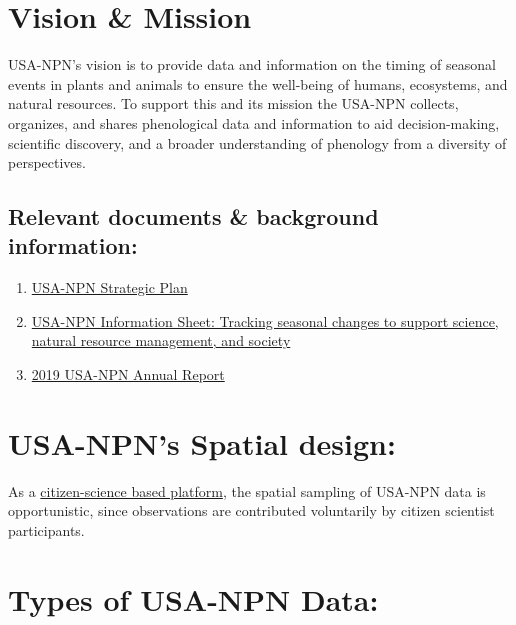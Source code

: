 \documentclass[]{book}
\begin{document}
\hypertarget{vision-mission}{%
\section{Vision \& Mission}\label{vision-mission}}

USA-NPN's vision is to provide data and information on the timing of seasonal events in plants and animals to ensure the well-being of humans, ecosystems, and natural resources. To support this and its mission the USA-NPN collects, organizes, and shares phenological data and information to aid decision-making, scientific discovery, and a broader understanding of phenology from a diversity of perspectives.

\hypertarget{relevant-documents-background-information}{%
\subsection{Relevant documents \& background information:}\label{relevant-documents-background-information}}

\begin{enumerate}
\def\labelenumi{\arabic{enumi}.}
\item
  \href{https://usanpn.org/files/npn/reports/USA-NPN_StrategicPlan_2019-2024.pdf}{USA-NPN Strategic Plan}
\item
  \href{https://usanpn.org/files/npn/reports/USA-NPN_InfoSheet_2020.pdf}{USA-NPN Information Sheet: Tracking seasonal changes to support science, natural resource management, and society}
\item
  \href{https://www.usanpn.org/files/npn/reports/USA-NPN_AnnualReport2019.pdf}{2019 USA-NPN Annual Report}
\end{enumerate}

\hypertarget{usa-npns-spatial-design}{%
\section{USA-NPN's Spatial design:}\label{usa-npns-spatial-design}}

As a \href{https://www.youtube.com/watch?v=WR34LGvuFac}{citizen-science based platform}, the spatial sampling of USA-NPN data is opportunistic, since observations are contributed voluntarily by citizen scientist participants.

\hypertarget{types-of-usa-npn-data}{%
\section{Types of USA-NPN Data:}\label{types-of-usa-npn-data}}
\end{document}
